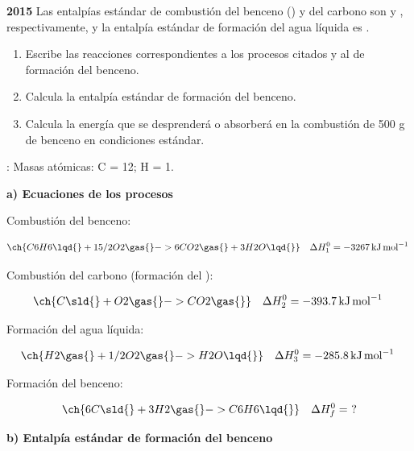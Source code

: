 \begin{exerciseEVAU}
    \textbf{2015} Las entalpías estándar de combustión del benceno () y del carbono son  y , respectivamente, y la entalpía estándar de formación del agua líquida es .
    \begin{enumerate}[label=\letraminuscula]
    \item Escribe las reacciones correspondientes a los procesos citados y al de formación del benceno.
    \item Calcula la entalpía estándar de formación del benceno.
    \item Calcula la energía que se desprenderá o absorberá en la combustión de 500 g de benceno en condiciones estándar.
    \end{enumerate}
    \datos{}: Masas atómicas: C = 12; H = 1.

    \begin{solu}

        \textbf{a) Ecuaciones de los procesos}

        Combustión del benceno:

        \begin{equation*}
            \ch{C6H6 \lqd{} + 15/2 O2 \gas{} -> 6 CO2 \gas{} + 3 H2O \lqd{}} \quad \Delta H^0_1 = \energia[kjmol]{-3267}
        \end{equation*}

        Combustión del carbono (formación del ):

        \begin{equation*}
            \ch{C \sld{} + O2 \gas{} -> CO2 \gas{}} \quad \Delta H^0_2 = \energia[kjmol]{-393.7}
        \end{equation*}

        Formación del agua líquida:

        \begin{equation*}
            \ch{H2 \gas{} + 1/2 O2 \gas{} -> H2O \lqd{}} \quad \Delta H^0_3 = \energia[kjmol]{-285.8}
        \end{equation*}

        Formación del benceno:

        \begin{equation*}
            \ch{6 C \sld{} + 3 H2 \gas{} -> C6H6 \lqd{}} \quad \Delta H^0_f = \ ?
        \end{equation*}

        \textbf{b) Entalpía estándar de formación del benceno}


\end{solu}
\end{exerciseEVAU}
